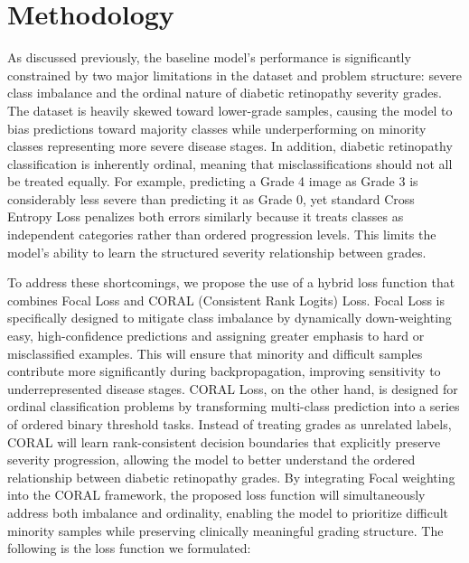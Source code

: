 \section{Methodology}
As discussed previously, the baseline model’s performance is significantly constrained by two major limitations in the dataset 
and problem structure: severe class imbalance and the ordinal nature of diabetic retinopathy severity grades. The dataset is 
heavily skewed toward lower-grade samples, causing the model to bias predictions toward majority classes while underperforming 
on minority classes representing more severe disease stages. In addition, diabetic retinopathy classification is inherently ordinal,
meaning that misclassifications should not all be treated equally. For example, predicting a Grade 4 image as Grade 3 is considerably
less severe than predicting it as Grade 0, yet standard Cross Entropy Loss penalizes both errors similarly because it treats
classes as independent categories rather than ordered progression levels. This limits the model’s ability to learn the structured 
severity relationship between grades.

To address these shortcomings, we propose the use of a hybrid loss function that combines Focal Loss and CORAL 
(Consistent Rank Logits) Loss. Focal Loss is specifically designed to mitigate class imbalance by dynamically down-weighting 
easy, high-confidence predictions and assigning greater emphasis to hard or misclassified examples. This will ensure that
minority and difficult samples contribute more significantly during backpropagation, improving sensitivity to
underrepresented disease stages. CORAL Loss, on the other hand, is designed for ordinal classification problems
by transforming multi-class prediction into a series of ordered binary threshold tasks. Instead of treating grades
as unrelated labels, CORAL will learn rank-consistent decision boundaries that explicitly preserve severity progression,
allowing the model to better understand the ordered relationship between diabetic retinopathy grades. By integrating
Focal weighting into the CORAL framework, the proposed loss function will simultaneously address both imbalance and ordinality,
enabling the model to prioritize difficult minority samples while preserving clinically meaningful grading structure. The 
following is the loss function we formulated:

